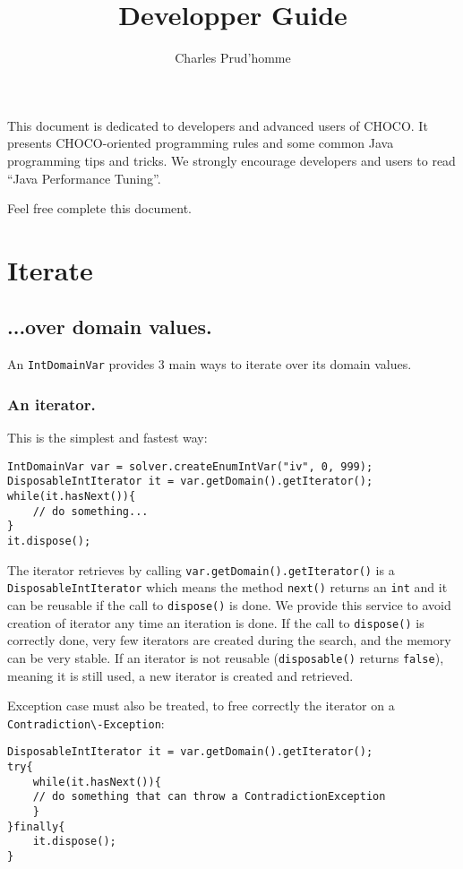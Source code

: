 \documentclass[11pt]{amsart}
\title{Developper Guide}
\author{Charles Prud'homme}
\newcommand{\mylst}[1]{\lstinline|#1|}
\begin{document}
\maketitle

This document is dedicated to developers and advanced users of CHOCO. 
It presents CHOCO-oriented programming rules and some common Java programming tips and tricks.
We strongly encourage developers and users to read ``Java Performance Tuning''\cite{Shirazi:2002:JPT:572520}.

Feel free complete this document.
\section{Iterate}

\subsection{...over domain values.}
An \mylst{IntDomainVar} provides 3 main ways to iterate over its domain values. 

\subsubsection{An iterator.} This is the simplest and fastest way:
\begin{lstlisting}
IntDomainVar var = solver.createEnumIntVar("iv", 0, 999);
DisposableIntIterator it = var.getDomain().getIterator();
while(it.hasNext()){
	// do something...
}
it.dispose();
\end{lstlisting}
The iterator retrieves by calling \mylst{var.getDomain().getIterator()} is a \mylst{DisposableIntIterator} which means the method \mylst{next()} returns an \mylst{int} and it can be reusable if the call to \mylst{dispose()} is done. We provide this service to avoid creation of iterator any time an iteration is done. If the call to \mylst{dispose()} is correctly done, very few iterators are created during the search, and the memory can be very stable.
If an iterator is not reusable (\mylst{disposable()} returns \mylst{false}), meaning it is still used, a new iterator is created and retrieved.

Exception case must also be treated, to free correctly the iterator on a \mylst{Contradiction\-Exception}:
\begin{lstlisting}
DisposableIntIterator it = var.getDomain().getIterator();
try{
	while(it.hasNext()){
	// do something that can throw a ContradictionException
	}
}finally{
	it.dispose();
}
\end{lstlisting}
\end{document}
